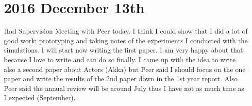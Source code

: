 \section*{2016 December 13th}
Had Supervision Meeting with Peer today. I think I could show that I did a lot of good work: prototyping and taking notes of the experiments I conducted with the simulations. I will start now writing the first paper. I am very happy about that because I love to write and can do so finally. I came up with the idea to write also a second paper about Actors (Akka) but Peer said I should focus on the one paper and write the results of the 2nd paper down in the 1st year report. Also Peer said the annual review will be around July thus I have not as much time as I expected (September).